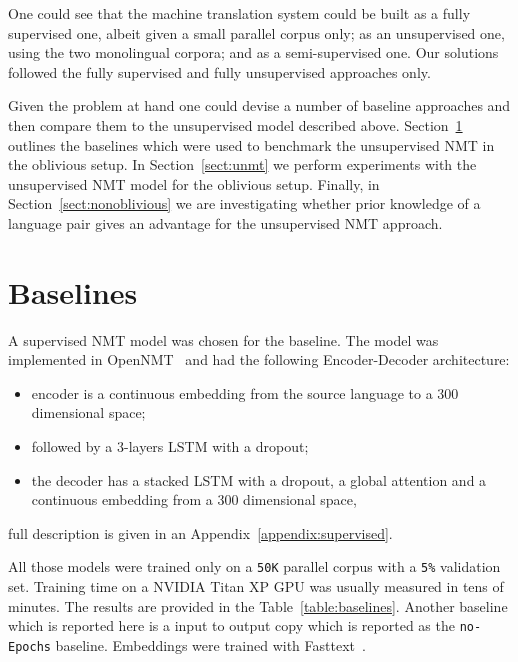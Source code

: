 \documentclass[]{article}
\begin{document}
One could see that the machine translation system could be built as a fully supervised one, albeit given a small parallel corpus only; as an unsupervised one, using the two monolingual corpora; and as a semi-supervised one.
Our solutions followed the fully supervised and fully unsupervised approaches only.

Given the problem at hand one could devise a number of baseline approaches and then compare them to the unsupervised model described above.
Section~\ref{sect:baselines} outlines the baselines which were used to benchmark the unsupervised NMT in the oblivious setup.
In Section~\ref{sect:unmt} we perform experiments with the unsupervised NMT model for the oblivious setup.
Finally, in Section~\ref{sect:nonoblivious} we are investigating whether prior knowledge of a language pair gives an advantage for the unsupervised NMT approach.

\section{Baselines}
\label{sect:baselines}

A supervised NMT model was chosen for the baseline.
The model was implemented in OpenNMT~\citep{opennmt} and had the following Encoder-Decoder architecture:
\begin{itemize}
\item encoder is a continuous embedding from the source language to a $300$ dimensional space;
\item followed by a $3$-layers LSTM with a dropout;
\item the decoder has a stacked LSTM with a dropout, a global attention \citep{luong2015effective} and a continuous embedding from a $300$ dimensional space,
\end{itemize}
full description is given in an Appendix~\ref{appendix:supervised}.

All those models were trained only on a {\tt 50K} parallel corpus with a {\tt 5\%} validation set.
Training time on a NVIDIA Titan XP GPU was usually measured in tens of minutes.
The results are provided in the Table~\ref{table:baselines}.
Another baseline which is reported here is a input to output copy which is reported as the {\tt no-Epochs} baseline.
Embeddings were trained with Fasttext~\citep{bojanowski2016enriching}.
\end{document}
